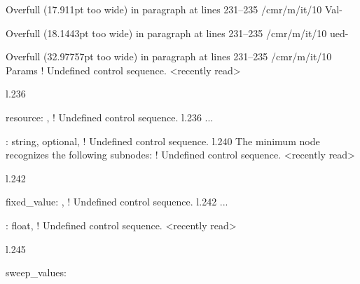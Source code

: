 {{{{{{{{{Overfull \hbox (17.911pt too wide) in paragraph at lines 231--235
/cmr/m/it/10 Val-

Overfull \hbox (18.1443pt too wide) in paragraph at lines 231--235
/cmr/m/it/10 ued-

Overfull \hbox (32.97757pt too wide) in paragraph at lines 231--235
/cmr/m/it/10 Params
! Undefined control sequence.
<recently read> \xmlAttr 
                         
l.236               \item \xmlAttr
                                  {resource}: ,
! Undefined control sequence.
l.236 ...       \item {}: \xmlDesc
                                                  {string, optional},
! Undefined control sequence.
l.240           The \xmlNode
                            {minimum} node recognizes the following subnodes:
! Undefined control sequence.
<recently read> \xmlNode 
                         
l.242             \item \xmlNode
                                {fixed\_value}: ,
! Undefined control sequence.
l.242 ...   \item {}: \xmlDesc
                                                  {float},
! Undefined control sequence.
<recently read> \xmlNode 
                         
l.245             \item \xmlNode
                                {sweep\_values}: }}}}}}}}}
